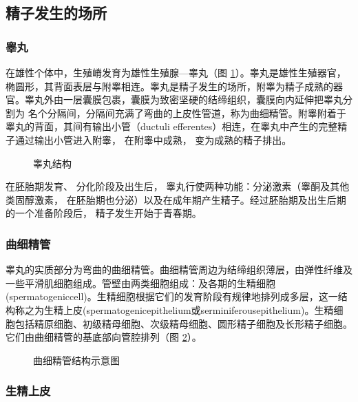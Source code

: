 \subsection{精子发生的场所}

\subsubsection{睾丸}

在雄性个体中，生殖嵴发育为雄性生殖腺---睾丸（图 \ref{figure_structure_of_testis}）。睾丸是雄性生殖器官，椭圆形，其背面表层与附睾相连。睾丸是精子发生的场所，附睾为精子成熟的器官。睾丸外由一层囊膜包裹，囊膜为致密坚硬的结缔组织，囊膜向内延伸把睾丸分割为 名个分隔间，分隔间充满了弯曲的上皮性管道，称为曲细精管。附睾附着于睾丸的背面，其间有输出小管（ductuli efferentes）相连，在睾丸中产生的完整精子通过输出小管进入附睾， 在附睾中成熟， 变为成熟的精子排出。

\begin{figure}
\centering
\myFigurePlaceholder
\caption{睾丸结构}
\label{figure_structure_of_testis}
\end{figure}

在胚胎期发育、 分化阶段及出生后， 睾丸行使两种功能：分泌激素（睾酮及其他类固醇激素， 在胚胎期也分泌）以及在成年期产生精子。经过胚胎期及出生后期的一个准备阶段后， 精子发生开始于青春期。

\subsubsection{曲细精管}

睾丸的实质部分为弯曲的曲细精管。曲细精管周边为结缔组织薄层，由弹性纤维及一些平滑肌细胞组成。管壁由两类细胞组成：及各期的生精细胞(spermatogeniccell)。生精细胞根据它们的发育阶段有规律地排列成多层，这一结构称之为生精上皮(spermatogenicepithelium或serminiferousepithelium)。生精细胞包括精原细胞、初级精母细胞、次级精母细胞、圆形精子细胞及长形精子细胞。它们由曲细精管的基底部向管腔排列（图 \ref{figure_structure_of_serminiferous_epithelium}）。

\begin{figure}
\centering
\myFigurePlaceholder
\caption{曲细精管结构示意图}
\label{figure_structure_of_serminiferous_epithelium}
\end{figure}

\subsubsection{生精上皮}

